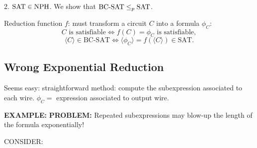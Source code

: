 2. $\mathrm{SAT}\in\mathrm{NPH}$. We show that $\mathrm{BC\text{-}SAT}\leq_p\mathrm{SAT}$.

Reduction function $f$: must transform a circuit $C$ into a formula $\phi_C$:
\[
C\text{ is satisfiable}\Longleftrightarrow f(C)=\phi_C\text{ is satisfiable},
\]
\[
\langle C\rangle\in\mathrm{BC\text{-}SAT}\Longleftrightarrow\langle\phi_C\rangle=f(\langle C\rangle)\in\mathrm{SAT}.
\]

\subsection{Wrong Exponential Reduction}
Seems easy: straightforward method: compute the subexpression associated to each wire. $\phi_C=$ expression associated to output wire.

\textbf{EXAMPLE:}
\textbf{PROBLEM:} Repeated subexpressions may blow-up the length of the formula exponentially!

CONSIDER:
